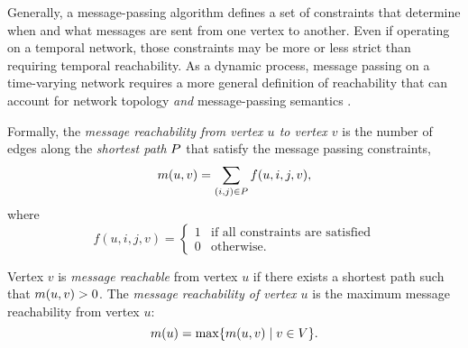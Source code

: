 Generally, a message-passing algorithm defines a set of constraints that determine when and what messages are sent from one vertex to another. Even if operating on a temporal network, those constraints may be more or less strict than requiring temporal reachability. As a dynamic process, message passing on a time-varying network requires a more general definition of reachability that can account for network topology \emph{and} message-passing semantics \cite{Barrat2013}.

Formally, the \emph{message reachability from vertex $u$ to vertex $v$} is the number of edges along the \emph{shortest path} $P$ that satisfy the message passing constraints,
%
\begin{equation*}
	m(u, v) = \sum_{(i, j) \in P} f(u, i, j, v),
\end{equation*}
%
where
%
\begin{equation*}
    f(u, i, j, v) = 
        \begin{cases}
            1 & \text{if all constraints are satisfied} \\ 
            0 & \text{otherwise.}
        \end{cases}
\end{equation*}

Vertex $v$ is \emph{message reachable} from vertex $u$ if there exists a shortest path such that $m(u, v) > 0$. The \emph{message reachability of vertex $u$} is the maximum message reachability from vertex $u$:
%
\begin{equation}\label{eq:vreach}
	m(u) = \max \{m(u, v) \mid v \in V\}.
\end{equation}

